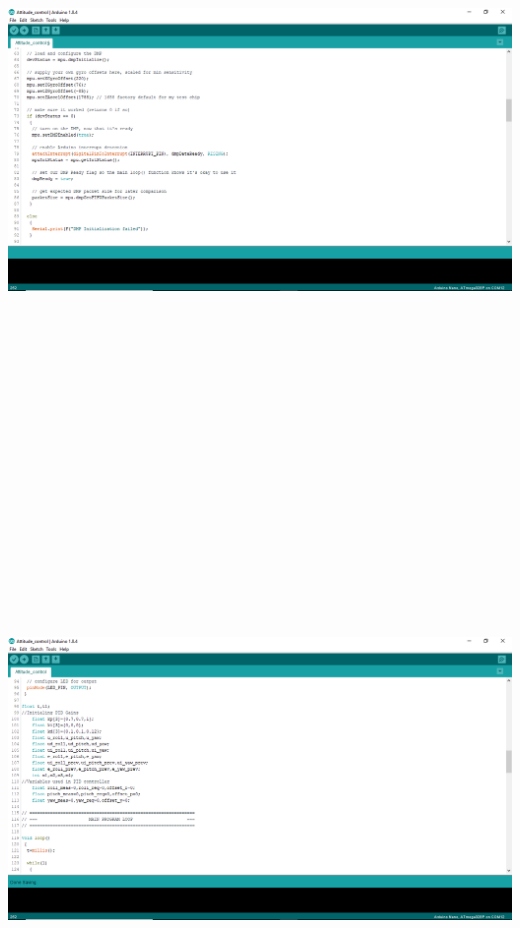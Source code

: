 \documentclass[9pt]{article}
\begin{document}
\begin{flushleft}
\newpage
\includegraphics[width=175mm,height=165mm]{25.jpg}
\newpage
\includegraphics[width=175mm,height=165mm]{26.jpg}

\end{flushleft}
\end{document}
